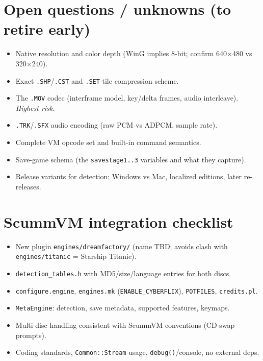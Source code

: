 \documentclass[11pt]{article}
\newcommand{\code}[1]{\texttt{#1}}
\begin{document}
\section{Open questions / unknowns (to retire early)}
\begin{itemize}[nosep]
  \item Native resolution and color depth (WinG implies 8-bit; confirm
        640$\times$480 vs 320$\times$240).
  \item Exact \code{.SHP}/\code{.CST} and \code{.SET}-tile compression scheme.
  \item The \code{.MOV} codec (interframe model, key/delta frames, audio
        interleave). \emph{Highest risk.}
  \item \code{.TRK}/\code{.SFX} audio encoding (raw PCM vs ADPCM, sample rate).
  \item Complete VM opcode set and built-in command semantics.
  \item Save-game schema (the \code{savestage1..3} variables and what they
        capture).
  \item Release variants for detection: Windows vs Mac, localized editions,
        later re-releases.
\end{itemize}

\section{ScummVM integration checklist}
\begin{itemize}[nosep]
  \item New plugin \code{engines/dreamfactory/} (name TBD; avoids clash with
        \code{engines/titanic} = Starship Titanic).
  \item \code{detection\_tables.h} with MD5/size/language entries for both discs.
  \item \code{configure.engine}, \code{engines.mk} (\code{ENABLE\_CYBERFLIX}),
        \code{POTFILES}, \code{credits.pl}.
  \item \code{MetaEngine}: detection, save metadata, supported features, keymaps.
  \item Multi-disc handling consistent with ScummVM conventions (CD-swap
        prompts).
  \item Coding standards, \code{Common::Stream} usage, \code{debug()}/console,
        no external deps.
\end{itemize}
\end{document}
